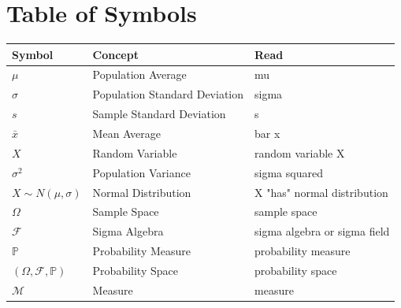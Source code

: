\documentclass{article}
\begin{document}
\newpage
\section{Table of Symbols}
\begin{tabularx}{1\textwidth} {|
  >{\raggedright\arraybackslash}X |
  >{\raggedright\arraybackslash}X |
  >{\raggedright\arraybackslash}X 
 |}
  \hline
 \textbf{Symbol} & \textbf{Concept} & \textbf{Read} \\
 \hline
 $\mu$ & Population Average & mu \\
 \hline
 $\sigma$ & Population Standard Deviation & sigma  \\
 \hline
 $s$ & Sample Standard Deviation & s \\
 \hline
 $\bar{x}$ & Mean Average & bar x \\
 \hline
 $X$ & Random Variable & random variable X \\
 \hline
 $\sigma^2$ & Population Variance & sigma squared \\
 \hline
 $X \sim N(\mu, \sigma)$ & Normal Distribution & X "has" normal distribution \\
 \hline
 $\Omega$  & Sample Space & sample space \\
 \hline
 $\mathcal{F}$  & Sigma Algebra & sigma algebra or sigma field \\
 \hline
 $\mathbb{P}$  & Probability Measure & probability measure \\
 \hline
 $(\Omega, \mathcal{F}, \mathbb{P})$  & Probability Space & probability space \\
 \hline
  $\mathcal{M}$  & Measure & measure \\
 \hline
\end{tabularx}

\newpage
\end{document}
